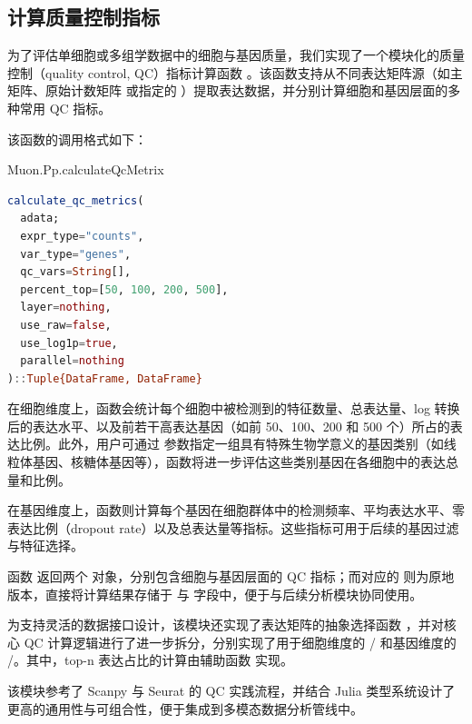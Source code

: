\subsection{计算质量控制指标}

为了评估单细胞或多组学数据中的细胞与基因质量，我们实现了一个模块化的质量控制（quality control, QC）指标计算函数 。该函数支持从不同表达矩阵源（如主矩阵、原始计数矩阵  或指定的 ）提取表达数据，并分别计算细胞和基因层面的多种常用 QC 指标。

该函数的调用格式如下：

\begin{fancybox}{Muon.Pp.calculateQcMetrix}
\begin{lstlisting}[language=julia]
calculate_qc_metrics(
  adata;
  expr_type="counts",
  var_type="genes",
  qc_vars=String[], 
  percent_top=[50, 100, 200, 500],
  layer=nothing,
  use_raw=false, 
  use_log1p=true,
  parallel=nothing
)::Tuple{DataFrame, DataFrame}
\end{lstlisting}
\end{fancybox}

在细胞维度上，函数会统计每个细胞中被检测到的特征数量、总表达量、log 转换后的表达水平、以及前若干高表达基因（如前 50、100、200 和 500 个）所占的表达比例。此外，用户可通过  参数指定一组具有特殊生物学意义的基因类别（如线粒体基因、核糖体基因等），函数将进一步评估这些类别基因在各细胞中的表达总量和比例。

在基因维度上，函数则计算每个基因在细胞群体中的检测频率、平均表达水平、零表达比例（dropout rate）以及总表达量等指标。这些指标可用于后续的基因过滤与特征选择。

函数  返回两个  对象，分别包含细胞与基因层面的 QC 指标；而对应的  则为原地版本，直接将计算结果存储于  与  字段中，便于与后续分析模块协同使用。

为支持灵活的数据接口设计，该模块还实现了表达矩阵的抽象选择函数 ，并对核心 QC 计算逻辑进行了进一步拆分，分别实现了用于细胞维度的 / 和基因维度的 /。其中，top-n 表达占比的计算由辅助函数  实现。

该模块参考了 Scanpy 与 Seurat 的 QC 实践流程，并结合 Julia 类型系统设计了更高的通用性与可组合性，便于集成到多模态数据分析管线中。

